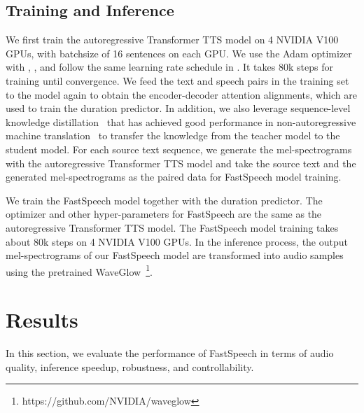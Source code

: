 \documentclass{article}
\begin{document}
\subsection{Training and Inference}
\label{sec_exp_train_infer}
We first train the autoregressive Transformer TTS model on 4 NVIDIA V100 GPUs, with batchsize of 16 sentences on each GPU. We use the Adam optimizer with , ,  and follow the same learning rate schedule in \citep{vaswani2017attention}. It takes 80k steps for training until convergence. We feed the text and speech pairs in the training set to the model again to obtain the encoder-decoder attention alignments, which are used to train the duration predictor. In addition, we also leverage sequence-level knowledge distillation~\citep{kim2016sequence} that has achieved good performance in non-autoregressive machine translation~\citep{gu2017non, guo2019aaai, wang2019non} to transfer the knowledge from the teacher model to the student model. For each source text sequence, we generate the mel-spectrograms with the autoregressive Transformer TTS model and take the source text and the generated mel-spectrograms as the paired data for FastSpeech model training. 


We train the FastSpeech model together with the duration predictor. The optimizer and other hyper-parameters for FastSpeech are the same as the autoregressive Transformer TTS model. 
The FastSpeech model training takes about 80k steps on 4 NVIDIA V100 GPUs. In the inference process, the output mel-spectrograms of our FastSpeech model are transformed into audio samples using the pretrained WaveGlow~\citep{prenger2019waveglow}\footnote{https://github.com/NVIDIA/waveglow}.

\section{Results}
In this section, we evaluate the performance of FastSpeech in terms of audio quality, inference speedup, robustness, and controllability.
\end{document}
